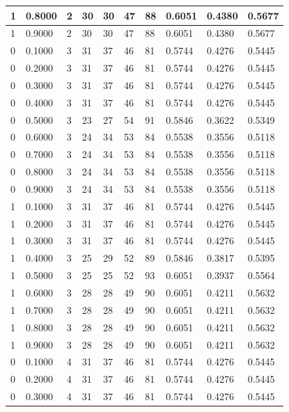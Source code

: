 \documentclass[12pt]{article}
\begin{document}
\begin{table}
{\begin{tabular}{| l | l | l | l | l | l | l | l | l | l |}
			1 & 0.8000 & 2 & 30 & 30 & 47 & 88 & 0.6051 & 0.4380 & 0.5677\\ \hline
			1 & 0.9000 & 2 & 30 & 30 & 47 & 88 & 0.6051 & 0.4380 & 0.5677\\ \hline
			0 & 0.1000 & 3 & 31 & 37 & 46 & 81 & 0.5744 & 0.4276 & 0.5445\\ \hline
			0 & 0.2000 & 3 & 31 & 37 & 46 & 81 & 0.5744 & 0.4276 & 0.5445\\ \hline
			0 & 0.3000 & 3 & 31 & 37 & 46 & 81 & 0.5744 & 0.4276 & 0.5445\\ \hline
			0 & 0.4000 & 3 & 31 & 37 & 46 & 81 & 0.5744 & 0.4276 & 0.5445\\ \hline
			0 & 0.5000 & 3 & 23 & 27 & 54 & 91 & 0.5846 & 0.3622 & 0.5349\\ \hline
			0 & 0.6000 & 3 & 24 & 34 & 53 & 84 & 0.5538 & 0.3556 & 0.5118\\ \hline
			0 & 0.7000 & 3 & 24 & 34 & 53 & 84 & 0.5538 & 0.3556 & 0.5118\\ \hline
			0 & 0.8000 & 3 & 24 & 34 & 53 & 84 & 0.5538 & 0.3556 & 0.5118\\ \hline
			0 & 0.9000 & 3 & 24 & 34 & 53 & 84 & 0.5538 & 0.3556 & 0.5118\\ \hline
			1 & 0.1000 & 3 & 31 & 37 & 46 & 81 & 0.5744 & 0.4276 & 0.5445\\ \hline
			1 & 0.2000 & 3 & 31 & 37 & 46 & 81 & 0.5744 & 0.4276 & 0.5445\\ \hline
			1 & 0.3000 & 3 & 31 & 37 & 46 & 81 & 0.5744 & 0.4276 & 0.5445\\ \hline
			1 & 0.4000 & 3 & 25 & 29 & 52 & 89 & 0.5846 & 0.3817 & 0.5395\\ \hline
			1 & 0.5000 & 3 & 25 & 25 & 52 & 93 & 0.6051 & 0.3937 & 0.5564\\ \hline
			1 & 0.6000 & 3 & 28 & 28 & 49 & 90 & 0.6051 & 0.4211 & 0.5632\\ \hline
			1 & 0.7000 & 3 & 28 & 28 & 49 & 90 & 0.6051 & 0.4211 & 0.5632\\ \hline
			1 & 0.8000 & 3 & 28 & 28 & 49 & 90 & 0.6051 & 0.4211 & 0.5632\\ \hline
			1 & 0.9000 & 3 & 28 & 28 & 49 & 90 & 0.6051 & 0.4211 & 0.5632\\ \hline
			0 & 0.1000 & 4 & 31 & 37 & 46 & 81 & 0.5744 & 0.4276 & 0.5445\\ \hline
			0 & 0.2000 & 4 & 31 & 37 & 46 & 81 & 0.5744 & 0.4276 & 0.5445\\ \hline
			0 & 0.3000 & 4 & 31 & 37 & 46 & 81 & 0.5744 & 0.4276 & 0.5445\\ \hline

\end{tabular}}
\end{table}
\end{document}

